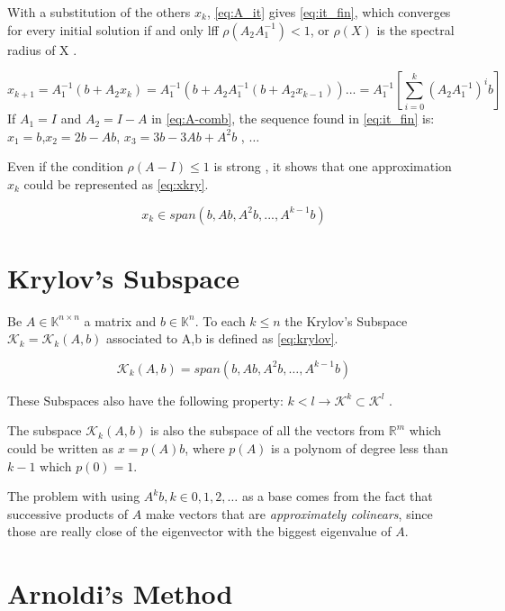     With a substitution of the others $x_{k}$, \ref{eq:A_it} gives \ref{eq:it_fin}, which converges for every initial solution if and only lff $\rho(A_{2}A_{1}^{-1}) < 1$, or $\rho(X)$ is the spectral radius of X \cite{bonnet}.

    \begin{equation}\label{eq:it_fin}
        x_{k+1} = A_{1}^{-1}(b + A_{2}x_{k}) = A_{1}^{-1}(b + A_{2}A_{1}^{-1}(b + A_{2}x_{k-1}))... = A_{1}^{-1} \left[ \sum_{i=0}^{k} (A_{2}A_{1}^{-1})^{i}b\right]
    \end{equation}
    If $A_{1} = I$ and $A_{2} = I - A$ in \ref{eq:A-comb}, the sequence found in \ref{eq:it_fin} is: $x_{1} = b$,$x_{2} = 2b- Ab$, $x_{3} = 3b-3Ab+A^{2}b$ , $\dots$

    Even if the condition $\rho(A-I) \leq 1$ is strong \cite{bonnet}, it shows that one approximation $x_{k}$ could be represented as \ref{eq:xkry}.
    
    \begin{equation}\label{eq:xkry}
        x_{k} \in span(b,Ab,A^{2}b,...,A^{k-1}b)
    \end{equation}

    \section{Krylov's Subspace}
    Be $A \in \mathbb{K}^{n \times n}$ a matrix and $b\in \mathbb{K}^{n}$. To each $k\leq n$ the Krylov's Subspace $\mathcal{K}_{k}=\mathcal{K}_{k}(A,b)$ associated to A,b is defined as \ref{eq:krylov}.

    \begin{equation}\label{eq:krylov}
        \mathcal{K}_{k}(A,b) = span(b,Ab,A^{2}b,\dots , A^{k-1}b)
    \end{equation}

    These Subspaces also have the following property: $k<l \to \mathcal{K}^{k} \subset \mathcal{K}^{l}$ \cite{bonnet}.

    The subspace $\mathcal{K}_{k}(A,b)$ is also the subspace of all the vectors from $\mathbb{R}^{m}$ which could be written as $x=p(A)b$, where $p(A)$ is a polynom of degree less than $k-1$ which $p(0)=1$.

    The problem with using ${A^{k}b}, k \in {0,1,2,\dots}$ as a base comes from the fact that successive products of $A$ make vectors that are \textit{approximately colinears}, since those are really close of the eigenvector with the biggest eigenvalue of $A$.

    \section{Arnoldi's Method}
    
